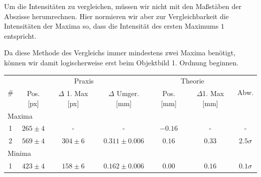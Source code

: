Um die Intensitäten zu vergleichen, müssen wir nicht mit den Maßstäben der Abszisse herumrechnen. Hier normieren wir aber zur Vergleichbarkeit die Intensitäten der Maxima so, dass die Intensität des ersten Maximums $1$ entspricht.

Da diese Methode des Vergleichs immer mindestens zwei Maxima benötigt, können wir damit logischerweise erst beim Objektbild 1. Ordnung beginnen.
\newpage

\begin{table}[H]
  \centering
  \begin{tabular}{|c|c|c|c|c|c|c|}\hline
    \multirow{2}{*}{\#} & \multicolumn{3}{c|}{Praxis} & \multicolumn{2}{c|}{Theorie} & \multirow{2}{*}{Abw.}\\\cline{2-6}
        & Pos. [px] & $\Delta$ 1. Max [px] & $\Delta$ Umger. [mm] & Pos. [mm] & $\Delta$1. Max [mm] & \\\hline
    \multicolumn{7}{|l|}{Maxima}\\\hline
    1   & $265 \pm 4$ & -                 & -             & $-0.16$ & -                 & - \\
    2   & $ 569 \pm 4$ & $304 \pm 6$ & $0.311 \pm 0.006$ & $0.16$ & $0.33$ & $2.5\sigma$\\\hline
    \multicolumn{7}{|l|}{Minima}\\\hline
    1   & $423 \pm 4$ & $158 \pm 6$ & $0.162 \pm 0.006$ & $0.00$ & $0.16$ & $0.1\sigma$\\\hline
  \end{tabular}
\end{table}